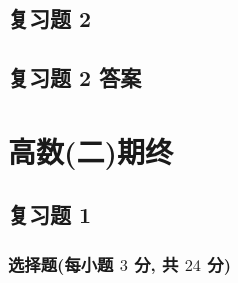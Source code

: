 \subsection{复习题 2}
\subsection{复习题 2 答案}




\section{高数(二)期终}
\subsection{复习题 1}
\subsubsection{选择题(每小题 $3$ 分, 共 $24$ 分)}
